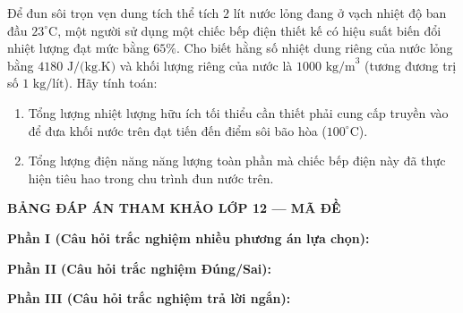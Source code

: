 \begin{ex}%
	Để đun sôi trọn vẹn dung tích thể tích $2\text{ lít}$ nước lỏng đang ở vạch nhiệt độ ban đầu $23^\circ\text{C}$, một người sử dụng một chiếc bếp điện thiết kế có hiệu suất biến đổi nhiệt lượng đạt mức bằng $65\%$. Cho biết hằng số nhiệt dung riêng của nước lỏng bằng $4180\text{ J/(kg.K)}$ và khối lượng riêng của nước là $1000\text{ kg/m}^3$ (tương đương trị số $1\text{ kg/lít}$). Hãy tính toán:
	\begin{enumerate}
		\item[a)] Tổng lượng nhiệt lượng hữu ích tối thiểu cần thiết phải cung cấp truyền vào để đưa khối nước trên đạt tiến đến điểm sôi bão hòa ($100^\circ\text{C}$).
		\item[b)] Tổng lượng điện năng năng lượng toàn phần mà chiếc bếp điện này đã thực hiện tiêu hao trong chu trình đun nước trên.
	\end{enumerate}
\end{ex}


\newpage
\begin{center} \textbf{BẢNG ĐÁP ÁN THAM KHẢO LỚP 12 --- MÃ ĐỀ \thedeso} \end{center}

\noindent \textbf{Phần I (Câu hỏi trắc nghiệm nhiều phương án lựa chọn):}  

\noindent \textbf{Phần II (Câu hỏi trắc nghiệm Đúng/Sai):}

\noindent \textbf{Phần III (Câu hỏi trắc nghiệm trả lời ngắn):}

\label{B\thedeso}

